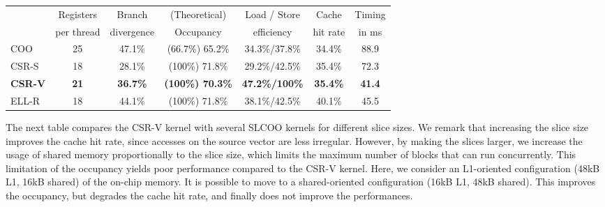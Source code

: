 \documentclass[runningheads,orivec]{llncs}
\begin{document}
  \begin{center}
    \begin{tabular}{|l||c|c|c|c|c||c|}
      \hline
        & \footnotesize Registers & \footnotesize Branch & \footnotesize (Theoretical) & \footnotesize Load / Store & \footnotesize Cache & \footnotesize Timing\\
        & \footnotesize per thread & \footnotesize divergence & \footnotesize Occupancy & \footnotesize efficiency & \footnotesize hit rate & \footnotesize in ms\\  
      \hline
      \hline
	  \footnotesize COO & \footnotesize 25 & \footnotesize 47.1\% & \footnotesize (66.7\%) 65.2\% & \footnotesize 34.3\%/37.8\% & \footnotesize 34.4\% & \footnotesize 88.9 \\
	  \hline
      \small CSR-S & \footnotesize 18 &  \footnotesize 28.1\% & \footnotesize (100\%) 71.8\% & \footnotesize 29.2\%/42.5\% & \footnotesize 35.4\% & \footnotesize 72.3 \\
	  \hline
      \bf \small CSR-V & \bf \footnotesize 21 & \bf \footnotesize 36.7\% & \bf \footnotesize (100\%) 70.3\% & \bf \footnotesize 47.2\%/100\% & \bf \footnotesize 35.4\% & \bf \footnotesize 41.4 \\
	  \hline
	  \footnotesize ELL-R & \footnotesize 18 & \footnotesize 44.1\% & \footnotesize (100\%) 71.8\%& \footnotesize 38.1\%/42.5\% & \footnotesize 40.1\% & \footnotesize 45.5 \\
	  \hline
    \end{tabular}
  \end{center}


\vspace*{-0.25cm}

The next table compares the CSR-V kernel with several SLCOO kernels for different slice sizes. We remark that increasing the slice size improves the cache hit rate, since accesses on the source vector are less irregular. However, by making the slices larger, we increase the usage of shared memory proportionally to the slice size, which limits the maximum number of blocks that can run concurrently. This limitation of the occupancy yields poor performance compared to the CSR-V kernel. Here, we consider an L1-oriented configuration (48kB L1, 16kB shared) of the on-chip memory. It is possible to move to a shared-oriented configuration (16kB L1, 48kB shared). This improves the occupancy, but degrades the cache hit rate, and finally does not improve the performances.

\vspace*{-0.25cm}
\end{document}
